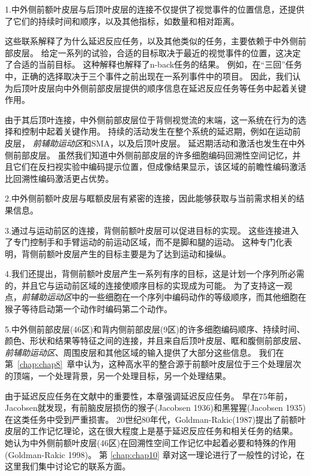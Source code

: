 1.中外侧前额叶皮层与后顶叶皮层的连接不仅提供了视觉事件的位置信息，还提供了它们的持续时间和顺序，以及其他指标，如数量和相对距离。


这些联系解释了为什么延迟反应任务，以及其他类似的任务，主要依赖于中外侧前部皮层。
给定一系列的试验，合适的目标取决于最近的视觉事件的位置，这决定了合适的当前目标。
这种解释也解释了n-back任务的结果。
例如，在“三回”任务中，正确的选择取决于三个事件之前出现在一系列事件中的项目。
因此，我们认为后顶叶皮层向中外侧前部皮层提供的顺序信息在延迟反应任务等任务中起着关键作用。


由于其后顶叶连接，中外侧前部皮层位于背侧视觉流的末端，这一系统在行为的选择和控制中起着关键作用。
持续的活动发生在整个系统的延迟期，例如在运动前皮层\cite{wise1985primate}， \textit{前辅助运动区}和SMA\cite{shima2000neuronal}，以及后顶叶皮层\cite{kalaska1995deciding}。
延迟期活动和激活也发生在中外侧前部皮层。
虽然我们知道中外侧前部皮层的许多细胞编码回溯性空间记忆\cite{genovesio2006neuronal}，并且它们在反扫视实验中编码提示位置\cite{funahashi1993prefrontal}，但成像结果显示，该区域的前瞻性编码激活比回溯性编码激活更占优势。
\par


2.中外侧前额叶皮层与眶额皮层有紧密的连接\cite{barbas1989architecture}，因此能够获取与当前需求相关的结果信息。
\par


3.通过与运动前区的连接，背侧前额叶皮层可以促进目标的实现。
这些连接进入了专门控制手和手臂运动的前运动区域，而不是脚和腿的运动。
这种专门化表明，背侧前额叶皮层产生的目标主要是为了达到运动和操纵。
\par


4.我们还提出，背侧前额叶皮层产生一系列有序的目标，这是计划一个序列所必需的，并且它与运动前区域的连接使顺序目标的实现成为可能。
为了支持这一观点，\textit{前辅助运动区}中的一些细胞在一个序列中编码动作的等级顺序\cite{shima2000neuronal}，而其他细胞在猴子等待启动第一个动作时编码第二个动作\cite{nakajima2009covert}。
\par


5.中外侧前部皮层(46区)和背内侧前部皮层(9区)的许多细胞编码顺序、持续时间、颜色、形状和结果等特征之间的连接，并且来自后顶叶皮层、眶和腹侧前部皮层、\textit{前辅助运动区}、周围皮层和其他区域的输入提供了大部分这些信息。
我们在第~\ref{chap:chap8}~章中认为，这种高水平的整合源于前额叶皮层位于三个处理层次的顶端，一个处理背景，另一个处理目标，另一个处理结果。


由于延迟反应任务在文献中的重要性，本章强调延迟反应任务。
早在75年前，Jacobsen就发现，有前脑皮层损伤的猴子(Jacobsen 1936)和黑猩猩(Jacobsen 1935)在这类任务中受到严重损害。
20世纪80年代，Goldman-Rakic(1987)提出了前额叶皮层的工作记忆理论，这在很大程度上是基于延迟反应任务和相关任务的结果。
她认为中外侧前额叶皮层(46区)在回溯性空间工作记忆中起着必要和特殊的作用(Goldman-Rakic 1998)。
第 \ref{chap:chap10} 章对这一理论进行了一般性的讨论，在这里我们集中讨论它的联系方面。


